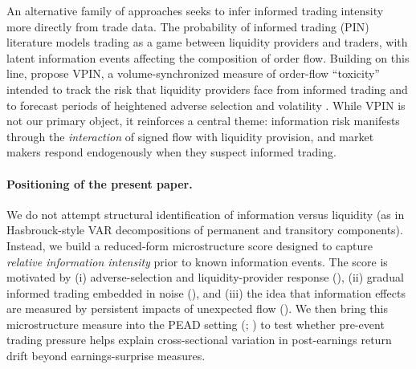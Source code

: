 An alternative family of approaches seeks to infer informed trading intensity more directly from trade data.
The probability of informed trading (PIN) literature models trading as a game between liquidity providers
and traders, with latent information events affecting the composition of order flow. Building on this line,
\citet{EasleyLopezdePradoOHara2012} propose VPIN, a volume-synchronized measure of order-flow ``toxicity''
intended to track the risk that liquidity providers face from informed trading and to forecast periods of
heightened adverse selection and volatility \citep{EasleyLopezdePradoOHara2012}. While VPIN is not our primary
object, it reinforces a central theme: information risk manifests through the \emph{interaction} of signed
flow with liquidity provision, and market makers respond endogenously when they suspect informed trading.

\paragraph{Positioning of the present paper.}
We do not attempt structural identification of information versus liquidity (as in Hasbrouck-style VAR
decompositions of permanent and transitory components). Instead, we build a reduced-form microstructure
score designed to capture \emph{relative information intensity} prior to known information events. The score
is motivated by (i) adverse-selection and liquidity-provider response (\citealp{GlostenMilgrom1985}),
(ii) gradual informed trading embedded in noise (\citealp{Kyle1985}), and (iii) the idea that information
effects are measured by persistent impacts of unexpected flow (\citealp{Hasbrouck1991}). We then bring this
microstructure measure into the PEAD setting (\citealp{BallBrown1968}; \citealp{BernardThomas1989}) to test
whether pre-event trading pressure helps explain cross-sectional variation in post-earnings return drift
beyond earnings-surprise measures.
